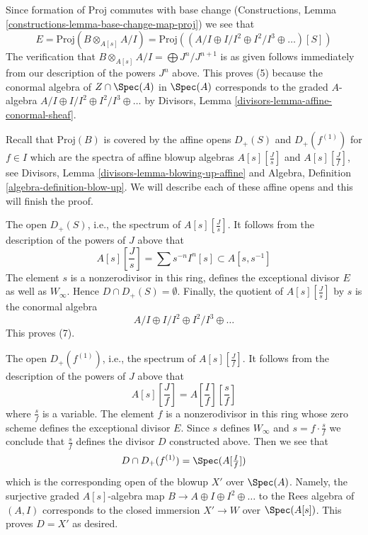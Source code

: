 \medskip\noindent
Since formation of $\text{Proj}$ commutes with base change
(Constructions, Lemma \ref{constructions-lemma-base-change-map-proj})
we see that
$$
E = \text{Proj}(B \otimes_{A[s]} A/I) =
\text{Proj}((A/I \oplus I/I^2 \oplus I^2/I^3 \oplus \ldots)[S])
$$
The verification that $B \otimes_{A[s]} A/I = \bigoplus J^n/J^{n + 1}$
is as given
follows immediately from our description of the powers $J^n$ above.
This proves (5) because the conormal algebra of $Z \cap \Spec(A)$
in $\Spec(A)$ corresponds to the graded $A$-algebra
$A/I \oplus I/I^2 \oplus I^2/I^3 \oplus \ldots$ by
Divisors, Lemma \ref{divisors-lemma-affine-conormal-sheaf}.

\medskip\noindent
Recall that $\text{Proj}(B)$ is covered by the affine opens
$D_+(S)$ and $D_+(f^{(1)})$ for $f \in I$ which are
the spectra of affine blowup algebras $A[s][\frac{J}{s}]$
and $A[s][\frac{J}{f}]$, see
Divisors, Lemma \ref{divisors-lemma-blowing-up-affine} and
Algebra, Definition \ref{algebra-definition-blow-up}.
We will describe each of these affine opens and this will finish the
proof.

\medskip\noindent
The open $D_+(S)$, i.e., the spectrum of $A[s][\frac{J}{s}]$.
It follows from the description of the powers of $J$ above
that
$$
A[s][\textstyle{\frac{J}{s}}] = \sum s^{-n}I^n[s] \subset A[s, s^{-1}]
$$
The element $s$ is a nonzerodivisor in this ring, defines the exceptional
divisor $E$ as well as $W_\infty$. Hence $D \cap D_+(S) = \emptyset$.
Finally, the quotient of $A[s][\frac{J}{s}]$ by $s$ is the conormal algebra
$$
A/I \oplus I/I^2 \oplus I^2/I^3 \oplus \ldots
$$
This proves (7).

\medskip\noindent
The open $D_+(f^{(1)})$, i.e., the spectrum of $A[s][\frac{J}{f}]$.
It follows from the description of the powers of $J$ above that
$$
A[s][\textstyle{\frac{J}{f}}] =
A[\textstyle{\frac{I}{f}}][\textstyle{\frac{s}{f}}]
$$
where $\frac{s}{f}$ is a variable. The element $f$ is a nonzerodivisor
in this ring whose zero scheme defines the exceptional divisor $E$.
Since $s$ defines $W_\infty$ and $s = f \cdot \frac{s}{f}$
we conclude that $\frac{s}{f}$ defines
the divisor $D$ constructed above. Then we see that
$$
D \cap D_+(f^{(1)}) = \Spec(A[\textstyle{\frac{I}{f}}])
$$
which is the corresponding open of the blowup $X'$ over $\Spec(A)$.
Namely, the surjective graded $A[s]$-algebra map
$B \to A \oplus I \oplus I^2 \oplus \ldots$
to the Rees algebra of $(A, I)$ corresponds to the closed
immersion $X' \to W$ over $\Spec(A[s])$.
This proves $D = X'$ as desired.


